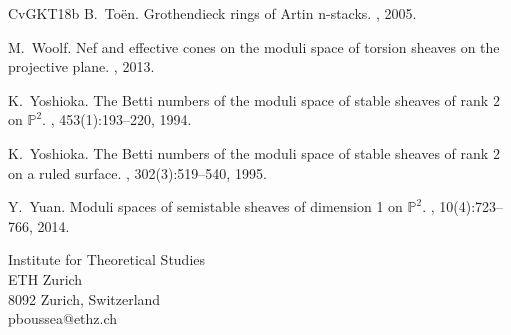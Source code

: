 \documentclass[12pt, a4paper]{amsart}
\begin{document}
\begin{thebibliography}{CvGKT18b}
B.~To{\"e}n.
\newblock Grothendieck rings of {A}rtin n-stacks.
, 2005.


M.~Woolf.
\newblock Nef and effective cones on the moduli space of torsion sheaves on the
  projective plane.
, 2013.

K.~Yoshioka.
\newblock The {B}etti numbers of the moduli space of stable sheaves of rank $2$
  on $\mathbb{P}^2$.
, 453(1):193--220, 1994.

K.~Yoshioka.
\newblock The {B}etti numbers of the moduli space of stable sheaves of rank $2$
  on a ruled surface.
, 302(3):519--540, 1995.

Y.~Yuan.
\newblock Moduli spaces of semistable sheaves of dimension 1 on {$\mathbb{P}^2$}.
, 10(4):723--766, 2014.

\end{thebibliography}




\vspace{+8 pt}
\noindent
Institute for Theoretical Studies \\
ETH Zurich \\
8092 Zurich, Switzerland \\
pboussea@ethz.ch
\end{document}
